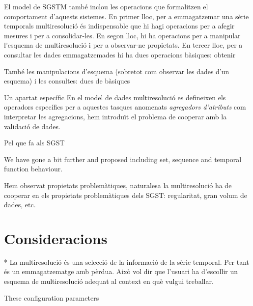 El model de \gls{SGSTM} també inclou les operacions que formalitzen el
comportament d'aquests sistemes. En primer lloc, per a emmagatzemar
una sèrie temporals multiresolució és indispensable que hi hagi
operacions per a afegir mesures i per a consolidar-les. En segon lloc,
hi ha operacions per a manipular l'esquema de multiresolució i per a
observar-ne propietats. En tercer lloc, per a consultar les dades emmagatzemades  hi ha dues operacions bàsiques: obtenir 


També les manipulacions d'esquema (sobretot com observar les dades d'un esquema) i les consultes: dues de bàsiques



Un apartat específic
En el model de dades multiresolució es defineixen els operadors específics per a aquestes tasques anomenats \emph{agregadors d'atributs}
com interpretar les agregacions, hem introduït el problema de cooperar amb la validació de dades.



Pel que fa als \gls{SGST}

We have gone a bit further and proposed  including
 set, sequence and temporal function behaviour.

Hem observat propietats problemàtiques, naturalesa
la multiresolució ha de cooperar en els propietats problemàtiques dels \gls{SGST}: regularitat, gran volum de dades, etc.




\section{Consideracions}

* La multiresolució és una selecció de la informació de la sèrie temporal. Per tant és un emmagatzematge amb pèrdua. Això vol dir que l'usuari ha d'escollir un esquema de multiresolució adequat al context en què vulgui treballar.


 These configuration parameters




